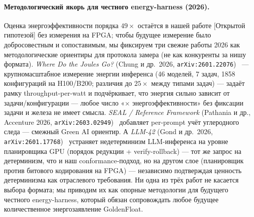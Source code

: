\documentclass[11pt,a4paper]{article}
\theoremstyle{plain}
\begin{document}
\paragraph{Методологический якорь для честного energy-harness (2026).}
Оценка энергоэффективности порядка \(49\times\) остаётся в нашей работе
[Открытой гипотезой] без измерения на FPGA; чтобы будущее измерение
было добросовестным и сопоставимым, мы фиксируем три свежие работы
2026 как методологические ориентиры для протокола замера (не как
конкуренты за нишу формата). \emph{Where Do the Joules Go?} (Chung и др.\
2026, \texttt{arXiv:2601.22076})~\cite{joules2026} --- крупномасштабное
измерение энергии инференса (46 моделей, 7 задач, 1858
конфигураций на H100/B200; различия до \(25\times\) между типами
задач) --- задаёт рамку throughput-per-watt и подчёркивает, что
энергия сильно зависит от задачи/конфигурации --- любое число
«\(\times\) энергоэффективности» без фиксации задачи и железа
не имеет смысла. \emph{SEAL / Reference Framework} (Pathania и др.,
Accenture 2026, \texttt{arXiv:2603.02949})~\cite{seal2026} добавляет
per-prompt учёт углеродного следа --- смежный Green AI ориентир.
А \emph{LLM-42} (Gond и др.\ 2026,
\texttt{arXiv:2601.17768})~\cite{llm42_2026} устраняет недетерминизм
LLM-инференса на уровне планировщика GPU (порядок редукции +
verify-rollback) --- тот же запрос на детерминизм, что и наш
conformance-подход, но на другом слое (планировщик против
битового кодирования на FPGA) --- независимо подтверждая
ценность детерминизма как отраслевого требования.
Ни одна из трёх работ не касается выбора формата; мы приводим
их как опорные методологии для будущего честного energy-harness,
который обязан сопровождать любое будущее количественное
энергозаявление GoldenFloat.
\end{document}
